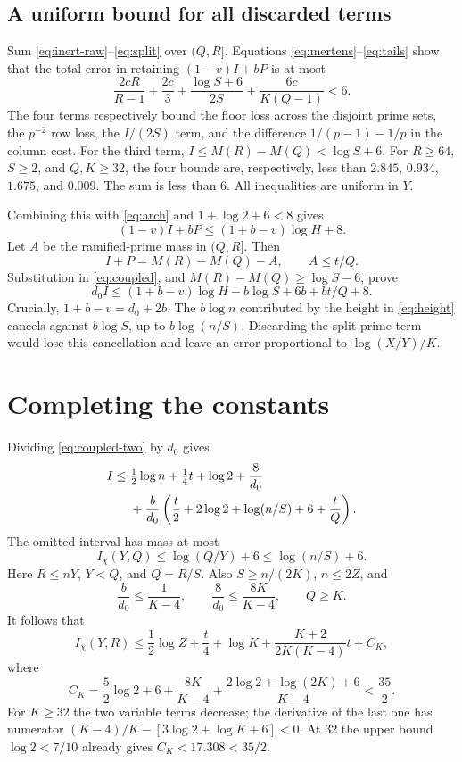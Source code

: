 \documentclass[11pt]{article}
\begin{document}
\subsection{A uniform bound for all discarded terms}
Sum \eqref{eq:inert-raw}--\eqref{eq:split} over $(Q,R]$.
Equations \eqref{eq:mertens}--\eqref{eq:tails} show that the total
error in retaining $(1-v)I+bP$ is at most
\begin{equation}\label{eq:error}
 \frac{2cR}{R-1}+\frac{2c}{3}
 +\frac{\log S+6}{2S}+\frac{6c}{K(Q-1)}<6.
\end{equation}
The four terms respectively bound the floor loss across the disjoint
prime sets, the $p^{-2}$ row loss, the $I/(2S)$ term, and the
difference $1/(p-1)-1/p$ in the column cost. For the third term,
$I\le M(R)-M(Q)<\log S+6$.
For $R\ge64$, $S\ge2$, and $Q,K\ge32$, the four bounds are,
respectively, less than $2.845$, $0.934$, $1.675$, and $0.009$.
The sum is less than 6. All inequalities are uniform in $Y$.

Combining this with \eqref{eq:arch} and $1+\log2+6<8$ gives
\begin{equation}\label{eq:coupled}
 (1-v)I+bP\le(1+b-v)\log H+8.
\end{equation}
Let $A$ be the ramified-prime mass in $(Q,R]$. Then
\[
 I+P=M(R)-M(Q)-A,\qquad A\le t/Q.
\]
Substitution in \eqref{eq:coupled}, and
$M(R)-M(Q)\ge\log S-6$, prove
\begin{equation}\label{eq:coupled-two}
 d_0I\le(1+b-v)\log H-b\log S+6b+bt/Q+8.
\end{equation}
Crucially, $1+b-v=d_0+2b$. The $b\log n$ contributed by the
height in \eqref{eq:height} cancels against $b\log S$, up to
$b\log(n/S)$. Discarding the split-prime term would lose this
cancellation and leave an error proportional to $\log(X/Y)/K$.

\section{Completing the constants}
Dividing \eqref{eq:coupled-two} by $d_0$ gives
\begin{align}
 I\le{}&\tfrac12\log n+\tfrac14t+\log2+\frac8{d_0}\notag\\
 &+\frac b{d_0}
     \left(\frac t2+2\log2+\log(n/S)+6+\frac tQ\right).
 \label{eq:before-restore}
\end{align}
The omitted interval has mass at most
\[
 I_\chi(Y,Q)\le\log(Q/Y)+6\le\log(n/S)+6.
\]
Here $R\le nY$, $Y<Q$, and $Q=R/S$.
Also $S\ge n/(2K)$, $n\le2Z$, and
\[
 \frac b{d_0}\le\frac1{K-4},\qquad
 \frac8{d_0}\le\frac{8K}{K-4},\qquad Q\ge K.
\]
It follows that
\begin{equation}\label{eq:K-bound}
 I_\chi(Y,R)\le\frac12\log Z+\frac t4+\log K
 +\frac{K+2}{2K(K-4)}t+C_K,
\end{equation}
where
\begin{equation}\label{eq:CK}
 C_K=\frac52\log2+6+\frac{8K}{K-4}
       +\frac{2\log2+\log(2K)+6}{K-4}<\frac{35}{2}.
\end{equation}
For $K\ge32$ the two variable terms decrease; the derivative of
the last one has numerator
$(K-4)/K-[3\log2+\log K+6]<0$. At 32 the upper bound
$\log2<7/10$ already gives $C_K<17.308<35/2$.
\end{document}
